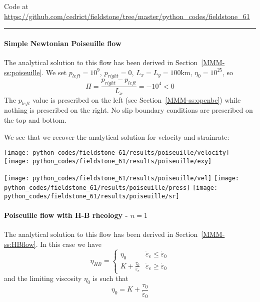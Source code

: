 

\begin{center}
Code at \url{https://github.com/cedrict/fieldstone/tree/master/python_codes/fieldstone_61}
\end{center}

\par\noindent\rule{\textwidth}{0.4pt}

\paragraph{Simple Newtonian Poiseuille flow} The analytical solution to this flow has been derived 
in Section~\ref{MMM-ss:poiseuille}.
We set $p_{left}=10^9$, $p_{right}=0$, $L_x=L_y=100$km, $\eta_0=10^{25}$, so 
\[
\Pi=\frac{p_{right}-p_{left}}{L_x}=-10^4 <0
\]
The $p_{left}$ value is prescribed on the left (see Section~\ref{MMM-ss:openbc}) while 
nothing is prescribed on the right. No slip boundary conditions are 
prescribed on the top and bottom.

We see that we recover the analytical solution for velocity and strainrate:
\begin{center}
\texttt{[image: python\_codes/fieldstone\_61/results/poiseuille/velocity]}
\texttt{[image: python\_codes/fieldstone\_61/results/poiseuille/exy]}
\end{center}

\begin{center}
\texttt{[image: python\_codes/fieldstone\_61/results/poiseuille/vel]}
\texttt{[image: python\_codes/fieldstone\_61/results/poiseuille/press]}
\texttt{[image: python\_codes/fieldstone\_61/results/poiseuille/sr]}
\end{center}

\paragraph{Poiseuille flow with H-B rheology - $n=1$} 
The analytical solution to this flow has been derived in Section~\ref{MMM-ss:HBflow}.
In this case we have 
\[
\eta_{HB}
=
\left\{
\begin{array}{lc}
\eta_0 & \dot{\varepsilon}_e\leq \dot{\varepsilon}_0 \\
K  + \frac{\tau_0}{\dot{\varepsilon}_e}  
& \dot{\varepsilon}_e\geq \dot{\varepsilon}_0 
\end{array}
\right.
\]
and the limiting viscosity $\eta_0$ is such that 
\[
\eta_0 = K  + \frac{\tau_0}{\dot{\varepsilon}_0}  
\]


